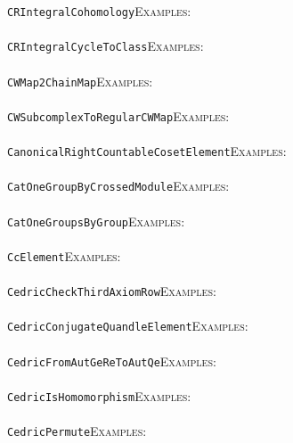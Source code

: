 \documentclass[a4paper,11pt]{report}
\begin{document}
{{ \texttt{CR{\textunderscore}IntegralCohomology}{\nobreakspace}{\nobreakspace}{\nobreakspace}{\nobreakspace}\textsc{Examples:} \\
 \\
 \texttt{CR{\textunderscore}IntegralCycleToClass}{\nobreakspace}{\nobreakspace}{\nobreakspace}{\nobreakspace}\textsc{Examples:} \\
 \\
 \texttt{CWMap2ChainMap}{\nobreakspace}{\nobreakspace}{\nobreakspace}{\nobreakspace}\textsc{Examples:} \\
 \\
 \texttt{CWSubcomplexToRegularCWMap}{\nobreakspace}{\nobreakspace}{\nobreakspace}{\nobreakspace}\textsc{Examples:} \\
 \\
 \texttt{CanonicalRightCountableCosetElement}{\nobreakspace}{\nobreakspace}{\nobreakspace}{\nobreakspace}\textsc{Examples:} \\
 \\
 \texttt{CatOneGroupByCrossedModule}{\nobreakspace}{\nobreakspace}{\nobreakspace}{\nobreakspace}\textsc{Examples:} \\
 \\
 \texttt{CatOneGroupsByGroup}{\nobreakspace}{\nobreakspace}{\nobreakspace}{\nobreakspace}\textsc{Examples:} \\
 \\
 \texttt{CcElement}{\nobreakspace}{\nobreakspace}{\nobreakspace}{\nobreakspace}\textsc{Examples:} \\
 \\
 \texttt{Cedric{\textunderscore}CheckThirdAxiomRow}{\nobreakspace}{\nobreakspace}{\nobreakspace}{\nobreakspace}\textsc{Examples:} \\
 \\
 \texttt{Cedric{\textunderscore}ConjugateQuandleElement}{\nobreakspace}{\nobreakspace}{\nobreakspace}{\nobreakspace}\textsc{Examples:} \\
 \\
 \texttt{Cedric{\textunderscore}FromAutGeReToAutQe}{\nobreakspace}{\nobreakspace}{\nobreakspace}{\nobreakspace}\textsc{Examples:} \\
 \\
 \texttt{Cedric{\textunderscore}IsHomomorphism}{\nobreakspace}{\nobreakspace}{\nobreakspace}{\nobreakspace}\textsc{Examples:} \\
 \\
 \texttt{Cedric{\textunderscore}Permute}{\nobreakspace}{\nobreakspace}{\nobreakspace}{\nobreakspace}\textsc{Examples:} \\
}}
\end{document}
